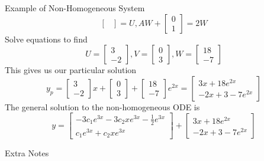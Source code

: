 \documentclass{article}
\begin{document}
\begin{multicols*}{3}
\begin{blackbox}{Example of Non-Homogeneous System}
{\[\begin{bmatrix}
            \end{bmatrix} = U, AW + \begin{bmatrix}
                0\\1
            \end{bmatrix} = 2W\]
            Solve equations to find\\[-2ex]
           \[U = \begin{bmatrix}
            3\\-2
           \end{bmatrix}, V = \begin{bmatrix}
            0\\3
           \end{bmatrix}, W = \begin{bmatrix}
            18\\-7
           \end{bmatrix}\]
            This gives us our particular solution
            \[
                y_p = \begin{bmatrix}
                    3\\-2
                \end{bmatrix}x + \begin{bmatrix}
                    0\\3
                \end{bmatrix} + \begin{bmatrix}
                    18\\-7
                \end{bmatrix}e^{2x} = \begin{bmatrix}
                    3x + 18e^{2x}\\
                    -2x+3 - 7e^{2x}
                \end{bmatrix}  
            \]
            The general solution to the non-homogeneous ODE is 
            \[
                y = \begin{bmatrix}
                    -3c_1e^{3x} - 3c_2xe^{3x} - \frac{1}{2}e^{3x}\\
                    c_1e^{3x} + c_2xe^{3x}
                \end{bmatrix}
                + \begin{bmatrix}
                    3x + 18e^{2x}\\
                    -2x+3 - 7e^{2x}
                \end{bmatrix}
            \]
        }
    \end{blackbox}
    \begin{blackbox}{Extra Notes}
        \hspace{300pt}
        \vspace{557pt}
    \end{blackbox}
    \end{multicols*}
\end{document}
